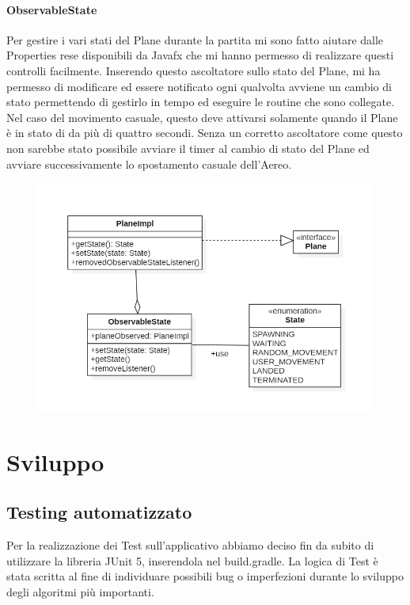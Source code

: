 \documentclass[a4paper,12pt]{report}
\begin{document}
\subsubsection{ObservableState}
Per gestire i vari stati del Plane durante la partita
mi sono fatto aiutare dalle Properties rese disponibili da Javafx che mi hanno permesso di realizzare questi controlli facilmente.
Inserendo questo ascoltatore sullo stato del Plane, mi ha permesso di modificare ed essere notificato ogni qualvolta avviene un cambio di 
stato permettendo di gestirlo in tempo ed eseguire le routine che sono collegate.
Nel caso del movimento casuale, questo deve attivarsi solamente quando il Plane è in stato di  da più di quattro secondi.
Senza un corretto ascoltatore come questo non sarebbe stato possibile avviare il timer al cambio di stato del Plane ed avviare successivamente 
lo spostamento casuale dell’Aereo.
\begin{figure}[H]
    \begin{center}
        \centering
        \includegraphics[width=\textwidth]{img/Design/Rodilosso/ObservableState.png}
    \end{center}
    \label{img:observable}
\end{figure}

\chapter{Sviluppo}

\section{Testing automatizzato}
Per la realizzazione dei Test sull’applicativo abbiamo deciso fin da subito di utilizzare la libreria JUnit 5, inserendola nel build.gradle.
La logica di Test è stata scritta al fine di individuare possibili bug o imperfezioni durante lo sviluppo degli algoritmi più importanti.
\end{document}
